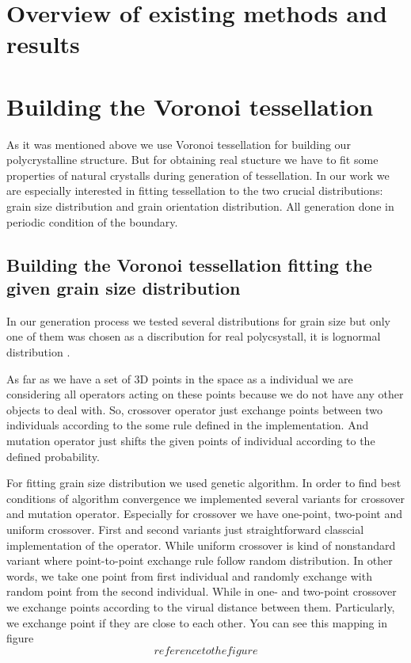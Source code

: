 \documentclass{article}
\begin{document}
\section{Overview of existing methods and results}


\section{Building the Voronoi tessellation}

As it was mentioned above we use Voronoi tessellation for building our polycrystalline structure. But for obtaining real stucture we have to fit some properties of natural crystalls during generation of tessellation. In our work we are especially interested in fitting tessellation to the two crucial distributions: grain size distribution and grain orientation distribution. All generation done in periodic condition of the boundary.

\subsection{Building the Voronoi tessellation fitting the given grain size distribution}

In our generation process we tested several distributions for grain size but only one of them was chosen as a discribution for real polycsystall, it is lognormal distribution \cite{shen15, liu14}.

As far as we have a set of 3D points in the space as a individual we are considering all operators acting on these points because we do not have any other objects to deal with.
So, crossover operator just exchange points between two individuals according to the some rule defined in the implementation. And mutation operator just shifts the given points of individual according to the defined probability.

For fitting grain size distribution we used genetic algorithm. In order to find best conditions of algorithm convergence we implemented several variants for crossover and mutation operator. Especially for crossover we have one-point, two-point and uniform crossover. First and second variants just straightforward classcial implementation of the operator. While uniform crossover is kind of nonstandard variant where point-to-point exchange rule follow random distribution. In other words, we take one point from first individual and randomly exchange with random point from the second individual. While in one- and two-point crossover we exchange points according to the virual distance between  them. Particularly, we exchange point if they are close to each other. You can see this mapping in figure \[reference to the figure\]
\end{document}
